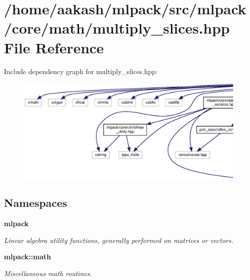 \section{/home/aakash/mlpack/src/mlpack/core/math/multiply\+\_\+slices.hpp File Reference}
\label{multiply__slices_8hpp}
Include dependency graph for multiply\+\_\+slices.\+hpp\+:
\nopagebreak
\begin{figure}[H]
\begin{center}
\leavevmode
\includegraphics[width=350pt]{multiply__slices_8hpp__incl}
\end{center}
\end{figure}
\subsection*{Namespaces}
\begin{DoxyCompactItemize}
\item 
 \textbf{ mlpack}
\begin{DoxyCompactList}\small\item\em Linear algebra utility functions, generally performed on matrices or vectors. \end{DoxyCompactList}\item 
 \textbf{ mlpack\+::math}
\begin{DoxyCompactList}\small\item\em Miscellaneous math routines. \end{DoxyCompactList}\end{DoxyCompactItemize}
